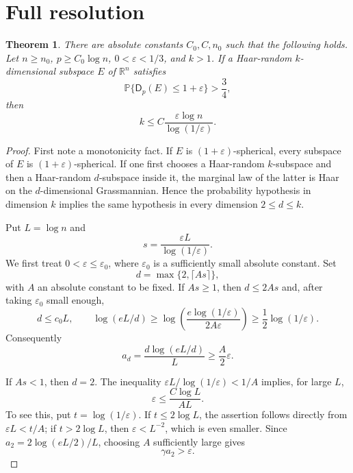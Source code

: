 \documentclass[11pt]{article}
\newtheorem{theorem}{Theorem}
\newcommand{\R}{\mathbb R}
\newcommand{\eps}{\varepsilon}
\newcommand{\Dist}{\mathsf D}
\newcommand{\Prob}{\mathbb P}
\begin{document}
\section{Full resolution}

\begin{theorem}\label{thm:main}
There are absolute constants $C_0,C,n_0$ such that the following holds.
Let $n\ge n_0$, $p\ge C_0\log n$, $0<\eps<1/3$, and $k>1$.  If a
Haar-random $k$-dimensional subspace $E$ of $\R^n$ satisfies
\[
       \Prob\{\Dist_p(E)\le1+\eps\}>\frac34,
\]
then
\begin{equation}\label{eq:main-bound}
       k\le C\frac{\eps\log n}{\log(1/\eps)}.
\end{equation}
\end{theorem}

\begin{proof}
First note a monotonicity fact.  If $E$ is $(1+\eps)$-spherical, every
subspace of $E$ is $(1+\eps)$-spherical.  If one first chooses a Haar-random
$k$-subspace and then a Haar-random $d$-subspace inside it, the marginal law
of the latter is Haar on the $d$-dimensional Grassmannian.  Hence the
probability hypothesis in dimension $k$ implies the same hypothesis in
every dimension $2\le d\le k$.

Put $L=\log n$ and
\[
       s=\frac{\eps L}{\log(1/\eps)}.
\]
 We first treat $0<\eps\le\eps_0$, where $\eps_0$ is a sufficiently small
 absolute constant.  Set
 \[
        d=\max\{2,\lceil As\rceil\},
 \]
 with $A$ an absolute constant to be fixed.  If $As\ge1$, then
 $d\le2As$ and, after taking $\eps_0$ small enough,
 \[
 d\le c_0L,
 \qquad
 \log(eL/d)
 \ge \log\left(\frac{e\log(1/\eps)}{2A\eps}\right)
 \ge\frac12\log(1/\eps).
 \]
 Consequently
 \begin{equation}\label{eq:invert-large}
       a_d=\frac{d\log(eL/d)}{L}\ge\frac A2\eps.
 \end{equation}

 If $As<1$, then $d=2$.  The inequality
 $\eps L/\log(1/\eps)<1/A$ implies, for large $L$,
 \begin{equation}\label{eq:tiny-eps}
       \eps\le \frac{C\log L}{AL}.
 \end{equation}
 To see this, put $t=\log(1/\eps)$.  If $t\le2\log L$, the assertion follows
 directly from $\eps L<t/A$; if $t>2\log L$, then
 $\eps<L^{-2}$, which is even smaller.  Since
 $a_2=2\log(eL/2)/L$, choosing $A$ sufficiently large gives
 \begin{equation}\label{eq:invert-small}
       \gamma a_2>\eps.
 \end{equation}


\end{proof}
\end{document}
